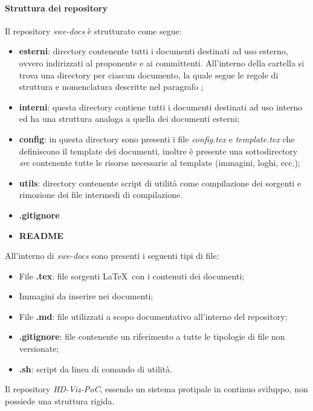 \paragraph{Struttura dei repository}
\label{par:struttura_repo}

Il repository \emph{swe-docs} è strutturato come segue:
\begin{itemize}
    \item \textbf{esterni}: directory contenente tutti i documenti destinati ad uso esterno, ovvero 
		indirizzati al proponente e ai committenti. All'interno della cartella si trova una directory per ciascun documento, la quale 
		segue le regole di struttura e nomenclatura descritte nel paragrafo ;
    \item \textbf{interni}: questa directory contiene tutti i documenti destinati ad uso interno ed ha una struttura analoga a quella dei 
    	documenti esterni;
    \item \textbf{config}: in questa directory sono presenti i file \emph{config.tex} e \emph{template.tex} 
    	che definiscono il template dei documenti, inoltre è presente una sottodirectory \emph{src} contenente tutte le risorse necessarie 
    	al template (immagini, loghi, ecc.);
    \item \textbf{utils}: directory contenente script di utilità come compilazione dei sorgenti e rimozione dei file intermedi di 
    	compilazione.
    \item \textbf{.gitignore}
    \item \textbf{README}
\end{itemize}

All'interno di \emph{swe-docs} sono presenti i seguenti tipi di file:
\begin{itemize}
    \item File \textbf{.tex}: file sorgenti \LaTeX\ con i contenuti dei documenti;
    \item Immagini da inserire nei documenti;
    \item File \textbf{.md}: file utilizzati a scopo documentativo all'interno del repository;
    \item \textbf{.gitignore}: file contenente un riferimento a tutte le tipologie di file non versionate;
    \item \textbf{.sh}: script da linea di comando di utilità.
\end{itemize}


Il repository \emph{HD-Viz-PoC}, essendo un sistema protipale in continuo sviluppo, non possiede una struttura rigida.

